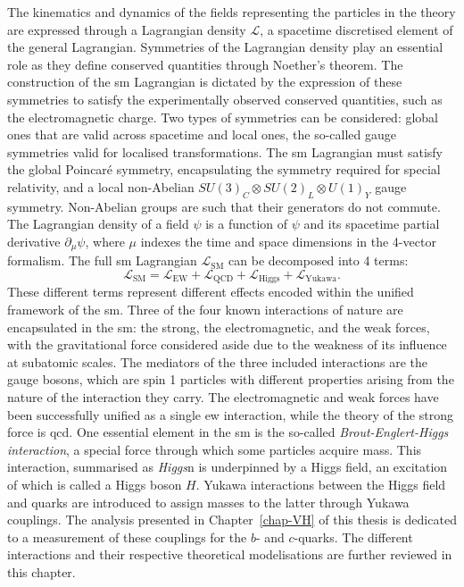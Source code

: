 The kinematics and dynamics of the fields representing the particles in the theory are expressed through a Lagrangian density $\mathcal{L}$, a spacetime discretised element of the general Lagrangian. Symmetries of the Lagrangian density play an essential role as they define conserved quantities through Noether's theorem. The construction of the \gls{sm} Lagrangian is dictated by the expression of these symmetries to satisfy the experimentally observed conserved quantities, such as the electromagnetic charge. Two types of symmetries can be considered: global ones that are valid across spacetime and local ones, the so-called gauge symmetries valid for localised transformations. The \gls{sm} Lagrangian must satisfy the global Poincaré symmetry, encapsulating the symmetry required for special relativity, and a local non-Abelian $SU(3)_C \otimes SU(2)_L \otimes U(1)_Y$ gauge symmetry. Non-Abelian groups are such that their generators do not commute. The Lagrangian density of a field $\psi$ is a function of $\psi$ and its spacetime partial derivative $\partial_{\mu} \psi$, where $\mu$ indexes the time and space dimensions in the 4-vector formalism. The full \gls{sm} Lagrangian $\mathcal{L}_{\text{SM}}$ can be decomposed into 4 terms:
\begin{equation}\label{eq-SMGlobal}
    \mathcal{L}_{\text{SM}} = \mathcal{L}_{\text{EW}} + \mathcal{L}_{\text{QCD}} + \mathcal{L}_{\text{Higgs}} + \mathcal{L}_{\text{Yukawa}}.
\end{equation}
These different terms represent different effects encoded within the unified framework of the \gls{sm}. Three of the four known interactions of nature are encapsulated in the \gls{sm}: the strong, the electromagnetic, and the weak forces, with the gravitational force considered aside due to the weakness of its influence at subatomic scales. The mediators of the three included interactions are the gauge bosons, which are spin 1 particles with different properties arising from the nature of the interaction they carry. The electromagnetic and weak forces have been successfully unified as a single \gls{ew} interaction, while the theory of the strong force is \gls{qcd}. One essential element in the \gls{sm} is the so-called \textit{Brout-Englert-Higgs interaction}, a special force through which some particles acquire mass. This interaction, summarised as \textit{Higgs}n is underpinned by a Higgs field, an excitation of which is called a Higgs boson $H$. Yukawa interactions between the Higgs field and quarks are introduced to assign masses to the latter through Yukawa couplings. The analysis presented in Chapter~\ref{chap-VH} of this thesis is dedicated to a measurement of these couplings for the $b$- and $c$-quarks. The different interactions and their respective theoretical modelisations are further reviewed in this chapter.

